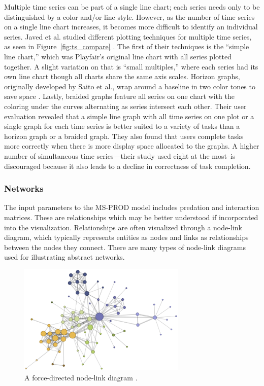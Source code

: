 \documentclass{article}
\begin{document}
Multiple time series can be part of a single line chart; each series needs only to be distinguished by a color and/or line style.  However, as the number of time series on a single line chart increases, it becomes more difficult to identify an individual series.  Javed et al. studied different plotting techniques for multiple time series, as seen in Figure~\ref{fig:ts_compare} \cite{Javed:2010:GPM:1907651.1907971}.  The first of their techniques is the ``simple line chart,'' which was Playfair's original line chart with all series plotted together.  A slight variation on that is ``small multiples,'' where each series had its own line chart though all charts share the same axis scales.  Horizon graphs, originally developed by Saito et al., wrap around a baseline in two color tones to save space \cite{saitoTwoTone}.  Lastly, braided graphs feature all series on one chart with the coloring under the curves alternating as series intersect each other.  Their user evaluation revealed that a simple line graph with all time series on one plot or a single graph for each time series is better suited to a variety of tasks than a horizon graph or a braided graph.  They also found that users complete tasks more correctly when there is more display space allocated to the graphs.  A higher number of simultaneous time series---their study used eight at the most--is discouraged because it also leads to a decline in correctness of task completion.

\subsubsection{Networks}

The input parameters to the MS-PROD model includes predation and interaction matrices.  These are relationships which may be better understood if incorporated into the visualization. Relationships are often visualized through a node-link diagram, which typically represents entities as nodes and links as relationships between the nodes they connect.  There are many types of node-link diagrams used for illustrating abstract networks.

\begin{figure}[h]
	\centering
	\includegraphics[width=8cm]{figures/force.eps}
	\caption{A force-directed node-link diagram \cite{Knuth:1993:SGP:164984}.}
	\label{fig:forcedirected}
\end{figure}
\end{document}
